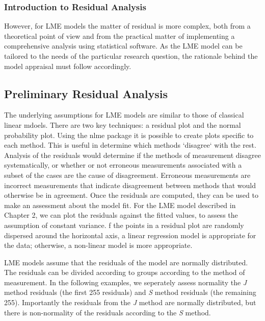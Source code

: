 \documentclass[12pt, a4paper]{report}
\theoremstyle{plain}
\theoremstyle{definition}
\theoremstyle{remark}
\begin{document}
	\subsubsection{Introduction to Residual Analysis}

	
	However, for LME models the matter of residual is more complex, both from a theoretical point of view and from the practical matter of implementing a comprehensive analysis using statistical software. As the LME model can be tailored to the needs of the particular research question, the rationale behind the model appraisal must follow accordingly.
	
	
	
	\subsection*{Preliminary Residual Analysis }
	
	The underlying assumptions for LME models are similar to those of classical linear mdoels. There are two key techniques: a residual plot and the normal probability plot. Using the nlme package it is possible to create plots specific to each method. This is useful in determine which methods `disagree` with the rest.
	Analysis of the residuals would determine if the methods of measurement disagree systematically, or whether or not erroneous measurements associated with a subset of the cases are the cause of disagreement.
	Erroneous measurements are incorrect measurements that indicate disagreement between methods that would otherwise be in agreement.
	Once the residuals are computed, they can be used to make an assessment about the model fit. For the LME model described in Chapter 2, we can plot the residuals against the fitted values, to assess the assumption of constant variance. f the points in a residual plot are randomly dispersed around the horizontal axis, a linear regression model is appropriate for the data; otherwise, a non-linear model is more appropriate.
	
	
	LME models assume that the residuals of the model are normally distributed.  The residuals can be divided according to groups according to the method of measurement. In the following examples, we seperately assess normality the \textit{J} method residuals (the first 255 residuals) and \textit{S} method residuals (the remaining 255). Importantly the residuals from the \textit{J} method are normally distributed, but there is non-normality of the residuals according to the \textit{S} method.
	
\end{document}
